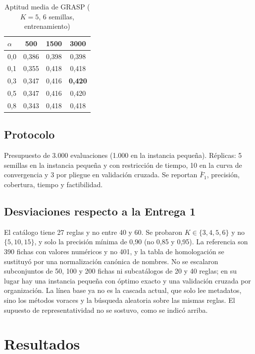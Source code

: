 \documentclass[conference]{IEEEtran}
\begin{document}
	\begin{table}[t]
		\centering
		\caption{Aptitud media de GRASP ($K=5$, 6 semillas, entrenamiento)}
		\label{tab:ajuste}
		\footnotesize
		\begin{tabular}{lccc}
			\toprule
			$\alpha$ & 500 & 1500 & 3000 \\
			\midrule
			0,0 & 0,386 & 0,398 & 0,398 \\
			0,1 & 0,355 & 0,418 & 0,418 \\
			0,3 & 0,347 & 0,416 & \textbf{0,420} \\
			0,5 & 0,347 & 0,416 & 0,420 \\
			0,8 & 0,343 & 0,418 & 0,418 \\
			\bottomrule
		\end{tabular}
	\end{table}
	
	\subsection{Protocolo}
	Presupuesto de 3.000 evaluaciones (1.000 en la instancia peque\~na). R\'eplicas: 5 semillas en la instancia peque\~na y con restricci\'on de tiempo, 10 en la curva de convergencia y 3 por pliegue en validaci\'on cruzada. Se reportan $\bar F_1$, precisi\'on, cobertura, tiempo y factibilidad.
	
	\subsection{Desviaciones respecto a la Entrega 1}
	El cat\'alogo tiene 27 reglas y no entre 40 y 60. Se probaron $K\in\{3,4,5,6\}$ y no $\{5,10,15\}$, y solo la precisi\'on m\'inima de 0,90 (no 0,85 y 0,95). La referencia son 390 fichas con valores num\'ericos y no 401, y la tabla de homologaci\'on se sustituy\'o por una normalizaci\'on can\'onica de nombres. No se escalaron subconjuntos de 50, 100 y 200 fichas ni subcat\'alogos de 20 y 40 reglas; en su lugar hay una instancia peque\~na con \'optimo exacto y una validaci\'on cruzada por organizaci\'on. La l\'inea base ya no es la cascada actual, que solo lee metadatos, sino los m\'etodos voraces y la b\'usqueda aleatoria sobre las mismas reglas. El supuesto de representatividad no se sostuvo, como se indic\'o arriba.
	
	\section{Resultados}
	
\end{document}
